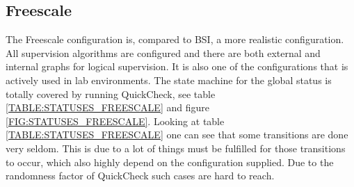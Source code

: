 \subsection{Freescale}
The Freescale configuration is, compared to BSI, a more realistic
configuration.  All supervision algorithms are configured and there
are both external and internal graphs for logical supervision. It is
also one of the configurations that is actively used in lab
environments. The state machine for the global status is totally
covered by running QuickCheck, see table
\ref{TABLE:STATUSES_FREESCALE} and figure
\ref{FIG:STATUSES_FREESCALE}. Looking at table \ref{TABLE:STATUSES_FREESCALE}
one can see that some transitions are done very seldom. This is due to a lot of
things must be fulfilled for those transitions to occur, which also highly depend on
the configuration supplied. Due to the randomness factor of QuickCheck such cases are
hard to reach.


